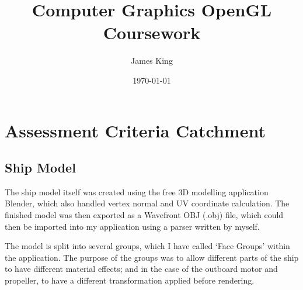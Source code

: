 \documentclass[a4paper,11pt]{article}
\title{Computer Graphics OpenGL Coursework}
\date{\today}
\author{James King}
\begin{document}
\maketitle

\section{Assessment Criteria Catchment}
\subsection{Ship Model}
The ship model itself was created using the free 3D modelling application Blender, which also handled vertex normal and UV coordinate calculation. The finished model was then exported as a Wavefront OBJ (.obj) file, which could then be imported into my application using a parser written by myself.

The model is split into several groups, which I have called `Face Groups' within the application. The purpose of the groups was to allow different parts of the ship to have different material effects; and in the case of the outboard motor and propeller, to have a different transformation applied before rendering.
\end{document}
